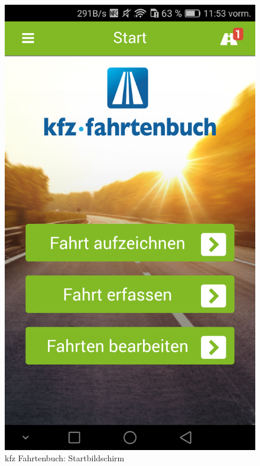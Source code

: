 \begin{figure}[H]%
    \begin{minipage}[b]{.4\linewidth} %
        \includegraphics[scale=0.14]{img/kfz1}
        \caption{\label{img:img/kfz1}kfz Fahrtenbuch: Startbildschirm}
    \end{minipage}
    \hspace{0.1\linewidth}%
    \begin{minipage}[b]{.4\linewidth} %

\end{minipage}
\end{figure}
